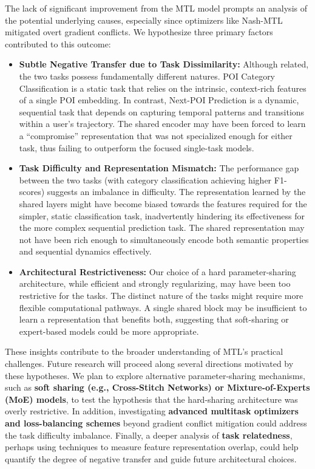 The lack of significant improvement from the MTL model prompts an analysis of the potential underlying causes, especially since optimizers like Nash-MTL mitigated overt gradient conflicts. We hypothesize three primary factors contributed to this outcome:
\begin{itemize}
    \item \textbf{Subtle Negative Transfer due to Task Dissimilarity:} Although related, the two tasks possess fundamentally different natures. POI Category Classification is a static task that relies on the intrinsic, context-rich features of a single POI embedding. In contrast, Next-POI Prediction is a dynamic, sequential task that depends on capturing temporal patterns and transitions within a user's trajectory. The shared encoder may have been forced to learn a ``compromise'' representation that was not specialized enough for either task, thus failing to outperform the focused single-task models.
    \item \textbf{Task Difficulty and Representation Mismatch:} The performance gap between the two tasks (with category classification achieving higher F1-scores) suggests an imbalance in difficulty. The representation learned by the shared layers might have become biased towards the features required for the simpler, static classification task, inadvertently hindering its effectiveness for the more complex sequential prediction task. The shared representation may not have been rich enough to simultaneously encode both semantic properties and sequential dynamics effectively.
    \item \textbf{Architectural Restrictiveness:} Our choice of a hard parameter-sharing architecture, while efficient and strongly regularizing, may have been too restrictive for the tasks. The distinct nature of the tasks might require more flexible computational pathways. A single shared block may be insufficient to learn a representation that benefits both, suggesting that soft-sharing or expert-based models could be more appropriate.
\end{itemize}

These insights contribute to the broader understanding of MTL's practical challenges. Future research will proceed along several directions motivated by these hypotheses. We plan to explore alternative parameter-sharing mechanisms, such as \textbf{soft sharing (e.g., Cross-Stitch Networks) or Mixture-of-Experts (MoE) models}, to test the hypothesis that the hard-sharing architecture was overly restrictive. In addition, investigating \textbf{advanced multitask optimizers and loss-balancing schemes} beyond gradient conflict mitigation could address the task difficulty imbalance. Finally, a deeper analysis of \textbf{task relatedness}, perhaps using techniques to measure feature representation overlap, could help quantify the degree of negative transfer and guide future architectural choices.
